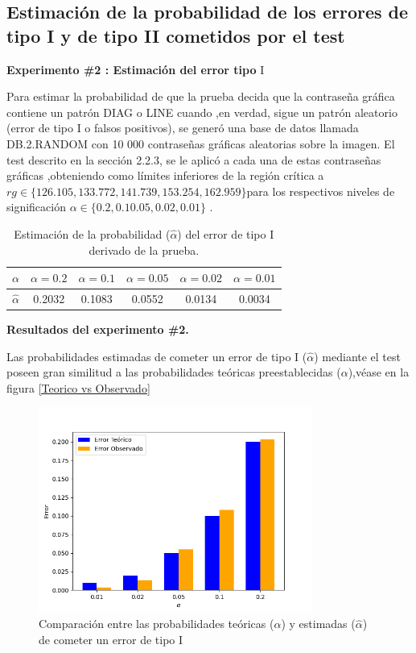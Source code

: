 \documentclass[12pt]{report}
\begin{document}
\subsection{Estimación de la probabilidad de los errores de tipo I y de tipo II  cometidos por el test}	 
\textbf{Experimento \#2 : Estimación del error tipo} I

Para estimar la probabilidad de que la prueba decida que la contraseña gráfica contiene un patrón DIAG o LINE cuando ,en verdad, sigue un patrón aleatorio (error de tipo I o falsos positivos), se generó una base de datos llamada DB.2.RANDOM con 10 000 contraseñas gráficas aleatorias sobre la imagen. El test descrito en la sección 2.2.3, se le aplicó a cada una de estas contraseñas gráficas ,obteniendo como límites inferiores de la región crítica a  $rg \in \{126.105, 133.772, 141.739, 153.254, 162.959\}$para los respectivos  niveles de significación $\alpha \in \{0.2, 0.1 0.05, 0.02 , 0.01\}$ .

\begin{table}[h!]
	\centering
	\begin{tabular}{|c|ccccc|}
		\hline
		$\alpha$ & $\alpha = 0.2$ & $\alpha = 0.1$ & $\alpha = 0.05$ & $\alpha = 0.02$ & $\alpha = 0.01$ \\
		\hline
		$\hat{\alpha}$ & 0.2032 & 0.1083 & 0.0552 & 0.0134 & 0.0034 \\
		\hline
	\end{tabular}
	\caption{Estimación de la probabilidad ($\hat{\alpha}$) del error de tipo I derivado de la prueba.}
	\label{tab:error1-prob1}
\end{table}

\textbf{Resultados del experimento \#2.}

Las probabilidades estimadas de cometer un error de tipo I ($\hat{\alpha}$) mediante el test poseen gran similitud  a las probabilidades teóricas preestablecidas ($\alpha$),véase en la figura \ref{Teorico vs Observado}
\begin{figure}[ht]
	\centering
	
	\includegraphics[width=0.8\textwidth]{4td_teo_obs.png}
	\caption{Comparación entre las probabilidades teóricas ($\alpha$) y estimadas ($\hat{\alpha}$) de cometer un error de tipo I }
	\label{Teorico vs Observado1}
\end{figure}\\
\end{document}
